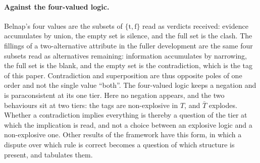 \paragraph{Against the four-valued logic.}\label{par:four-valued} Belnap's four values \cite{belnap1977useful} are the subsets of $\{\mathrm{t}, \mathrm{f}\}$ read as verdicts received: evidence accumulates by union, the empty set is silence, and the full set is the clash. The fillings of a two-alternative attribute in the fuller development \cite{Aethus} are the same four subsets read as alternatives remaining: information accumulates by narrowing, the full set is the blank, and the empty set is the contradiction, which is the tag of this paper. Contradiction and superposition are thus opposite poles of one order and not the single value ``both''. The four-valued logic keeps a negation and is paraconsistent at its one tier. Here no negation appears, and the two behaviours sit at two tiers: the tags are non-explosive in $T$, and $\bar{T}$ explodes. Whether a contradiction implies everything is thereby a question of the tier at which the implication is read, and not a choice between an explosive logic and a non-explosive one. Other results of the framework have this form, in which a dispute over which rule is correct becomes a question of which structure is present, and \cite{AethusBrief} tabulates them.

